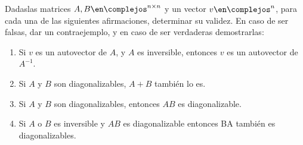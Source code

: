 \begin{enunciado}{\ejExtra}
	Dadaslas matrices $A, B \en \complejos^{n \times n}$ y un vector $v \en \complejos^n$, para cada una de las siguientes afirmaciones, determinar
	su validez. En caso de ser falsas, dar un contraejemplo, y en caso de ser verdaderas demostrarlas:
	\begin{enumerate}[label=(\alph*)]
		\item Si $v$ es un autovector de $A$, y $A$ es inversible, entonces $v$ es un autovector de $A^{-1}$.

		\item Si $A$ y $B$ son diagonalizables, $A+B$ también lo es.

		\item Si $A$ y $B$ son diagonalizables, entonces $AB$ es diagonalizable.

		\item Si $A$ o $B$ es inversible y $AB$ es diagonalizable entonces BA también es diagonalizables.
	\end{enumerate}
\end{enunciado}

